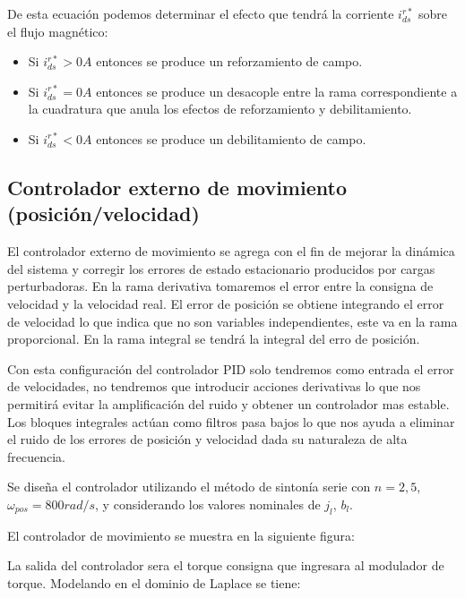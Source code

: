 \documentclass{article}
\begin{document}


De esta ecuación podemos determinar el efecto que tendrá la corriente $i_{ds}^{r*}$ sobre el flujo magnético:

\begin{itemize}
    \item Si $i_{ds}^{r*} > 0 A$ entonces se produce un reforzamiento de campo.
    \item Si $i_{ds}^{r*} = 0 A$ entonces se produce un desacople entre la rama correspondiente a 
    la cuadratura que anula los efectos de reforzamiento y debilitamiento.
    \item Si $i_{ds}^{r*} < 0 A$ entonces se produce un debilitamiento de campo.
\end{itemize}

\subsection*{Controlador externo de movimiento (posición/velocidad)}

El controlador externo de movimiento se agrega con el fin de mejorar la dinámica del sistema y corregir los
errores de estado estacionario producidos por cargas perturbadoras. En la rama derivativa tomaremos el 
error entre la consigna de velocidad y la velocidad real. El error de posición se obtiene integrando el 
error de velocidad lo que indica que no son variables independientes, este va en la rama proporcional.
En la rama integral se tendrá la integral del erro de posición. 

Con esta configuración del controlador PID solo tendremos como entrada el error de velocidades, no tendremos
que introducir acciones derivativas lo que nos permitirá evitar la amplificación del ruido y obtener un 
controlador mas estable. Los bloques integrales actúan como filtros pasa bajos lo que nos ayuda a eliminar
el ruido de los errores de posición y velocidad dada su naturaleza de alta frecuencia.

Se diseña el controlador utilizando el método de sintonía serie con $n = 2,5$, $\omega_{pos} = 800 rad/s$, y
considerando los valores nominales de $j_l$, $b_l$. 

El controlador de movimiento se muestra en la siguiente figura: 


La salida del controlador sera el torque consigna que ingresara al modulador de torque. Modelando en el 
dominio de Laplace se tiene:
\end{document}
